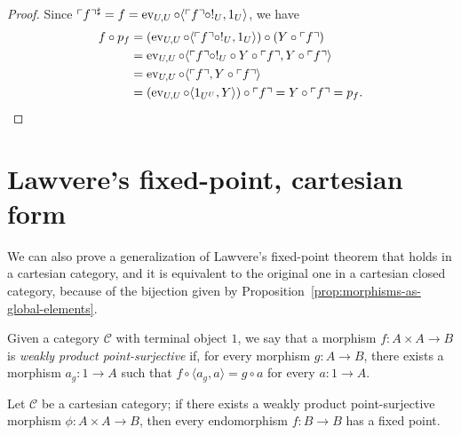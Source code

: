 \begin{proof}
    Since $\ulcorner f\urcorner^\sharp=f = \operatorname{ev}_{U,U} \circ \langle \ulcorner f \urcorner \circ !_U, 1_U \rangle$, we have
    \begin{align*}
        f\circ p_f &= (\operatorname{ev}_{U,U} \circ \langle \ulcorner f \urcorner \circ !_U, 1_U \rangle) \circ (Y\circ\ulcorner f\urcorner) \\
                   &= \operatorname{ev}_{U,U} \circ \langle \ulcorner f \urcorner \circ !_U \circ Y \circ \ulcorner f\urcorner, Y \circ \ulcorner f\urcorner \rangle \\
                   &= \operatorname{ev}_{U,U} \circ \langle\ulcorner f \urcorner, Y \circ \ulcorner f\urcorner\rangle \\
                   &= (\operatorname{ev}_{U,U} \circ \langle 1_{U^U}, Y \rangle) \circ \ulcorner f\urcorner = Y \circ \ulcorner f\urcorner = p_f.
    \end{align*}
\end{proof}


\section{Lawvere's fixed-point, cartesian form}
We can also prove a generalization of Lawvere's fixed-point theorem that holds in a cartesian category, and it is equivalent to the original one in a cartesian closed category, because of the bijection given by Proposition~\ref{prop:morphisms-as-global-elements}.

\begin{definition}
    Given a category $\mathcal C$ with terminal object $1$, we say that a morphism $f: A \times A \to B$ is \emph{weakly product point-surjective} if, for every morphism $g : A \to B$,
    there exists a morphism $a_g : 1 \to A$ such that $f \circ \langle a_g,a \rangle = g \circ a$ for every $a: 1 \to A$.
\end{definition}

\begin{theorem}
    Let $\mathcal C$ be a cartesian category; if there exists a weakly product point-surjective morphism $\phi : A \times A \to B$,
    then every endomorphism $f: B \to B$ has a fixed point.
\end{theorem}

